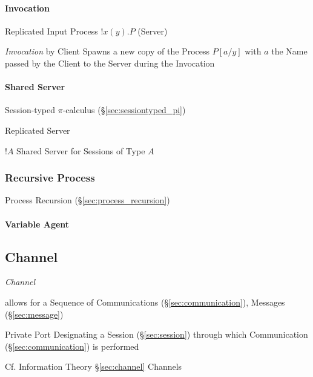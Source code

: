 \paragraph{Invocation}\label{sec:invocation}\hfill

Replicated Input Process $!x(y).P$ (Server)

\emph{Invocation} by Client Spawns a new copy of the Process $P[a/y]$
with $a$ the Name passed by the Client to the Server during the
Invocation



\paragraph{Shared Server}\label{sec:shared_server}\hfill

Session-typed $\pi$-calculus (\S\ref{sec:sessiontyped_pi})

Replicated Server

$!A$ Shared Server for Sessions of Type $A$



\subsubsection{Recursive Process}\label{sec:recursive_process}

Process Recursion (\S\ref{sec:process_recursion})



\paragraph{Variable Agent}\label{sec:variable_agent}\hfill



\subsection{Channel}\label{sec:process_channel}

\emph{Channel}

allows for a Sequence of Communications (\S\ref{sec:communication}),
Messages (\S\ref{sec:message})

Private Port Designating a Session (\S\ref{sec:session}) through which
Communication (\S\ref{sec:communication}) is performed
\cite{honda-vasconcelos-kubo98}

\fist Cf. Information Theory \S\ref{sec:channel} Channels

